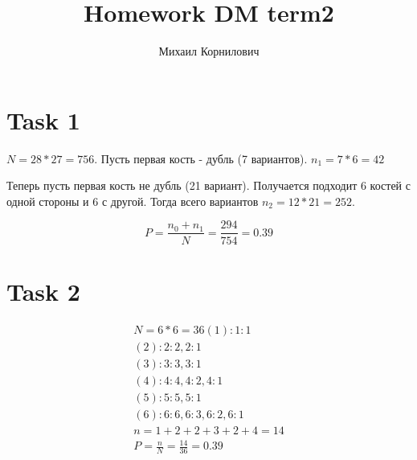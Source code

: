 \documentclass{article}
\title{Homework DM term2}
\author{Михаил Корнилович}
\begin{document}
    \maketitle
    \newpage
	
	\section{Task 1}
	$N = 28 * 27 = 756$. Пусть первая кость - дубль (7 вариантов). $n_1 = 7 * 6 = 42$
	
	\noindent Теперь пусть первая кость не дубль (21 вариант). Получается подходит 6 костей с одной стороны и 6 с другой. Тогда всего вариантов $n_2 = 12 * 21 = 252$.
	
	$$
		P = \frac{n_0 + n_1}{N} = \frac{294}{754} = 0.39
	$$
	
	\section{Task 2}
	
	\begin{align*}
		N = 6 * 6 = 36
		(1): 1 : 1 \\
		(2): 2 : 2, 2 : 1 \\
		(3): 3 : 3, 3 : 1 \\
		(4): 4 : 4, 4 : 2, 4 : 1 \\
		(5): 5 : 5, 5 : 1 \\
		(6): 6 : 6, 6 : 3, 6 : 2, 6 : 1 \\
		n = 1 + 2 + 2 + 3 + 2 + 4 = 14 \\
		P = \frac{n}{N} = \frac{14}{36} = 0.39
	\end{align*}
\end{document}
